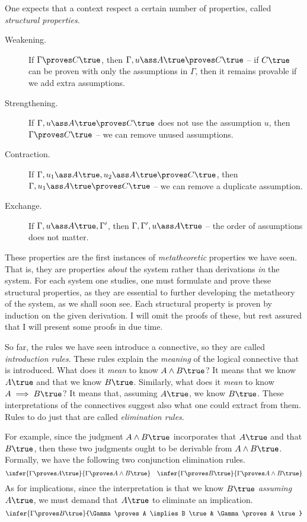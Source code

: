One expects that a context respect a certain number of properties, called
\emph{structural properties}.
\begin{description}
\item[Weakening.]
  If $\Gamma \proves C \true$,
  then $\Gamma, u\ass A\true \proves C \true$ --
  if $C \true$ can be proven with only the assumptions in
  $\Gamma$, then it remains provable if we add extra assumptions.
\item[Strengthening.]
  If $\Gamma, u\ass A\true \proves C\true$ does not use the assumption $u$,
  then $\Gamma \proves C\true$ --
  we can remove unused assumptions.
\item[Contraction.]
  If $\Gamma, u_1\ass A \true, u_2 \ass A \true \proves C \true$,
  then $\Gamma, u_1\ass A \true \proves C \true$ --
  we can remove a duplicate assumption.
\item[Exchange.]
  If $\Gamma, u\ass A \true, \Gamma^\prime$,
  then $\Gamma, \Gamma^\prime, u\ass A \true$ --
  the order of assumptions does not matter.
\end{description}
%
These properties are the first instances of \emph{metatheoretic} properties we
have seen.
That is, they are properties \emph{about} the system rather than derivations
\emph{in} the system.
For each system one studies, one must formulate and prove these structural
properties, as they are essential to further developing the metatheory of the
system, as we shall soon see.
Each structural property is proven by induction on the given derivation.
I will omit the proofs of these, but rest assured that I will present some
proofs in due time.

So far, the rules we have seen introduce a connective, so they are
called \emph{introduction rules}.
These rules explain the \emph{meaning} of the logical connective that is
introduced.
What does it \emph{mean} to know $A \land B \true$?
It means that we know $A \true$ and that we know $B \true$.
Similarly, what does it \emph{mean} to know $A \implies B \true$?
It means that, assuming $A \true$, we know $B \true$.
These interpretations of the connectives suggest also what one could extract
from them. Rules to do just that are called
\emph{elimination rules}.

For example, since the judgment $A \land B \true$ incorporates that $A \true$
and that $B \true$, then these two judgments ought to be derivable from
$A \land B \true$. Formally, we have the following two conjunction elimination
rules.
%
\[
  \infer{%
    \Gamma \proves A \true%
  }{%
    \Gamma \proves A \land B \true%
  }%
  \quad
  \infer{%
    \Gamma \proves B \true%
  }{%
    \Gamma \proves A \land B \true%
  }
\]
%
As for implications, since the interpretation is that we know $B \true$
\emph{assuming} $A \true$, we must demand that $A \true$ to eliminate an
implication.
%
\[
  \infer{%
    \Gamma \proves B \true
  }{%
    \Gamma \proves A \implies B \true
    &
    \Gamma \proves A \true
  }
\]

